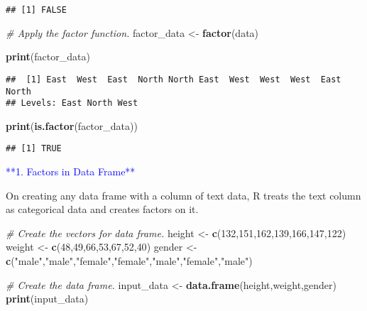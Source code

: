 \documentclass[
]{article}
\newenvironment{Shaded}{\begin{snugshade}}{\end{snugshade}}
\newcommand{\CommentTok}[1]{\textcolor[rgb]{0.56,0.35,0.01}{\textit{#1}}}
\newcommand{\DecValTok}[1]{\textcolor[rgb]{0.00,0.00,0.81}{#1}}
\newcommand{\FunctionTok}[1]{\textcolor[rgb]{0.13,0.29,0.53}{\textbf{#1}}}
\newcommand{\NormalTok}[1]{#1}
\newcommand{\OtherTok}[1]{\textcolor[rgb]{0.56,0.35,0.01}{#1}}
\newcommand{\StringTok}[1]{\textcolor[rgb]{0.31,0.60,0.02}{#1}}
\begin{document}
\begin{verbatim}
## [1] FALSE
\end{verbatim}

\begin{Shaded}
\begin{Highlighting}[]
\CommentTok{\# Apply the factor function.}
\NormalTok{factor\_data }\OtherTok{\textless{}{-}} \FunctionTok{factor}\NormalTok{(data)}

\FunctionTok{print}\NormalTok{(factor\_data)}
\end{Highlighting}
\end{Shaded}

\begin{verbatim}
##  [1] East  West  East  North North East  West  West  West  East  North
## Levels: East North West
\end{verbatim}

\begin{Shaded}
\begin{Highlighting}[]
\FunctionTok{print}\NormalTok{(}\FunctionTok{is.factor}\NormalTok{(factor\_data))}
\end{Highlighting}
\end{Shaded}

\begin{verbatim}
## [1] TRUE
\end{verbatim}

\textcolor{blue}{**1. Factors in Data Frame**}

On creating any data frame with a column of text data, R treats the text
column as categorical data and creates factors on it.

\begin{Shaded}
\begin{Highlighting}[]
\CommentTok{\# Create the vectors for data frame.}
\NormalTok{height }\OtherTok{\textless{}{-}} \FunctionTok{c}\NormalTok{(}\DecValTok{132}\NormalTok{,}\DecValTok{151}\NormalTok{,}\DecValTok{162}\NormalTok{,}\DecValTok{139}\NormalTok{,}\DecValTok{166}\NormalTok{,}\DecValTok{147}\NormalTok{,}\DecValTok{122}\NormalTok{)}
\NormalTok{weight }\OtherTok{\textless{}{-}} \FunctionTok{c}\NormalTok{(}\DecValTok{48}\NormalTok{,}\DecValTok{49}\NormalTok{,}\DecValTok{66}\NormalTok{,}\DecValTok{53}\NormalTok{,}\DecValTok{67}\NormalTok{,}\DecValTok{52}\NormalTok{,}\DecValTok{40}\NormalTok{)}
\NormalTok{gender }\OtherTok{\textless{}{-}} \FunctionTok{c}\NormalTok{(}\StringTok{"male"}\NormalTok{,}\StringTok{"male"}\NormalTok{,}\StringTok{"female"}\NormalTok{,}\StringTok{"female"}\NormalTok{,}\StringTok{"male"}\NormalTok{,}\StringTok{"female"}\NormalTok{,}\StringTok{"male"}\NormalTok{)}

\CommentTok{\# Create the data frame.}
\NormalTok{input\_data }\OtherTok{\textless{}{-}} \FunctionTok{data.frame}\NormalTok{(height,weight,gender)}
\FunctionTok{print}\NormalTok{(input\_data)}
\end{Highlighting}
\end{Shaded}
\end{document}
